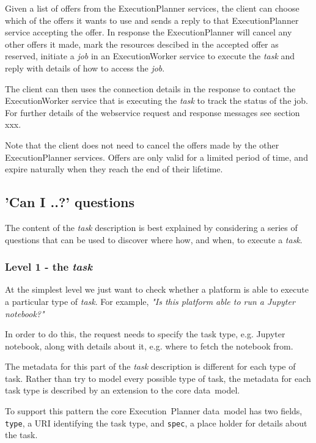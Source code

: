 \documentclass[11pt,a4paper]{ivoa}
\newcommand{\datamodel} {data~model}
\newcommand{\webservice} {webservice}
\newcommand{\execplanner} {ExecutionPlanner}
\newcommand{\execworker} {ExecutionWorker}
\newcommand{\executionplanner} {Execution~Planner}
\newcommand{\jupyter} {Jupyter}
\newcommand{\codeword}[1] {\texttt{#1}}
\newcommand{\excutabletask} {\textit{task}}
\newcommand{\workerjob} {\textit{job}}
\begin{document}
Given a list of offers from the \execplanner{} services, the client can choose which of the offers it
wants to use and sends a reply to that \execplanner{} service accepting the offer.
In response the \execplanner{} will cancel any other offers it made, mark the resources descibed in the accepted
offer as reserved, initiate a \workerjob{} in an \execworker{} service to execute the \excutabletask{}
and reply with details of how to access the \workerjob{}.

The client can then uses the connection details in the response to contact the \execworker{} service that
is executing the \excutabletask{} to track the status of the job.
For further details of the \webservice{} request and response messages see section xxx.

Note that the client does not need to cancel the offers made by the other \execplanner{} services.
Offers are only valid for a limited period of time, and expire naturally when they reach the end
of their lifetime.

\subsection{'Can I ..?' questions}
\label{subsec:questions}

The content of the \excutabletask{} description is best explained by considering a series of
questions that can be used to discover where how, and when, to execute a \excutabletask{}.

\subsubsection{Level 1 - the \excutabletask{}}
\label{subsubsec:thetask}

At the simplest level we just want to check whether a platform is able to execute a particular
type of \excutabletask{}.
For example, \textit{"Is this platform able to run a \jupyter{} notebook?"}

In order to do this, the request needs to specify the task type, e.g. \jupyter{} notebook,
along with details about it, e.g. where to fetch the notebook from.

The metadata for this part of the \excutabletask{} description is different for each type of task.
Rather than try to model every possible type of task, the metadata for each task type is described by
an extension to the core \datamodel{}.

To support this pattern the core \executionplanner{} \datamodel{} has two fields, \codeword{type},
a URI identifying the task type, and \codeword{spec}, a place holder for details about the task.
\end{document}
